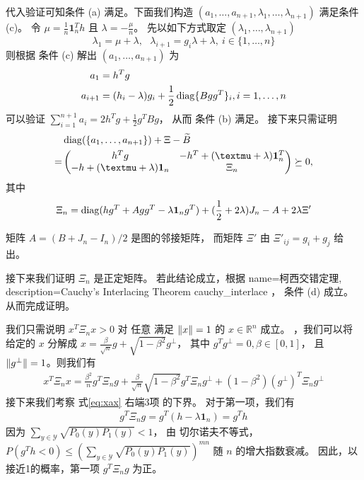 代入验证可知条件 (a) 满足。下面我们构造  $(a_1,\ldots,a_{n+1},\lambda_1,\ldots,\lambda_{n+1})$  满足条件 (c)。
令 $\mu=\frac{1}{n}\mathbf{1}_n^T h$ 且
$\lambda = -\frac{\mu}{n}$。 先以如下方式取定 $(\lambda_1,\ldots,\lambda_{n+1})$
$$
\lambda_1=\mu+\lambda, \text{  }\lambda_{i+1}=g_i\lambda + \lambda,~i\in\{1,\ldots,n\}
$$
则根据 条件 (c) 解出 $(a_1, \dots, a_{n+1})$ 为
\begin{align}
    a_1 &= h^T g \nonumber\\
    a_{i+1} & = (h_i -\lambda)g_i  + \frac{1}{2}\operatorname{diag}\{Bgg^T\}_i, i = 1, \dots, n
\end{align}
可以验证 $\sum_{i=1}^{n+1} a_i = 2h^Tg +\frac{1}{2} g^T B g$，
从而 条件 (b) 满足。
接下来只需证明
\begin{align}
    &\diag(\{a_1, \dots, a_{n+1}\}) + \Xi - \widetilde{B} \nonumber\\
    =& \begin{pmatrix} h^T g & -h^T +(\mu + \lambda)\mathbf{1}_n^T \\
        -h+(\mu + \lambda )\mathbf{1}_n & \Xi_n \end{pmatrix}
    \succeq 0, 
\end{align}
其中
\begin{align}\label{eq:Xi_n}
    \Xi_n =\operatorname{diag}(hg^T + Agg^T -\lambda \mathbf{1}_ng^T)
    + (\frac{1}{2} +2\lambda) J_n  - A + 2\lambda \Xi'
\end{align}

矩阵 $A=(B+J_n-I_n)/2$ 是图的邻接矩阵，
而矩阵 $\Xi'$ 由 $\Xi'_{ij}=g_i + g_j$ 给出。

接下来我们证明 $\Xi_n$ 是正定矩阵。
若此结论成立，根据
{name=柯西交错定理,
description={Cauchy's Interlacing Theorem}}
\gls{cauchy_interlace} \cite{hwang}，
条件 (d) 成立。
从而完成证明。

我们只需说明 $x^T \Xi_n x>0$ 对 任意 满足 $\lVert x\rVert=1$ 的 $x \in \mathbb{R}^n$ 成立。
，我们可以将 给定的 $x$ 分解成 $x=\frac{\beta}{\sqrt{n}} g
+ \sqrt{1-\beta^2} g^{\perp}$， 其中 $g^Tg^{\perp}=0, \beta \in [0,1]$，
且 $\lVert g^{\perp}\rVert=1$。则我们有 
\begin{align}\label{eq:xax}
    x^T \Xi_n x = \frac{\beta^2}{n} g^T \Xi_n g  
    +		\frac{\beta}{\sqrt{n}}\sqrt{1-\beta^2} g^T \Xi_n g^{\perp}
    +
    (1-\beta^2)(g^{\perp})^T \Xi_n g^{\perp}
\end{align}
接下来我们考察 式\eqref{eq:xax} 右端3项
的下界。
对于第一项，我们有
\begin{align*}
    g^T \Xi_n g = g^T(h -\lambda \mathbf{1}_n)   = g^T h
\end{align*}
因为 $\sum_{y \in \mathcal{Y}} \sqrt{P_0(y)P_1(y)} < 1$，
由 切尔诺夫不等式， 
$P(g^T h < 0) \leq (\sum_{y \in \mathcal{Y}} \sqrt{P_0(y)P_1(y)})^{mn}$
随 $n$ 的增大指数衰减。
因此，以接近1的概率，第一项 $g^T \Xi_n g$ 为正。


